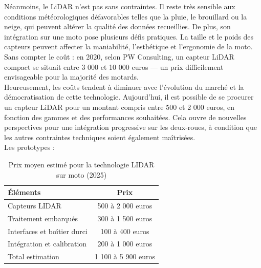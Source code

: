 Néanmoins, le LiDAR n’est pas sans contraintes. Il reste très sensible aux conditions météorologiques défavorables telles que la pluie, le brouillard ou la neige, qui peuvent altérer la qualité des données recueillies. De plus, son intégration sur une moto pose plusieurs défis pratiques. La taille et le poids des capteurs peuvent affecter la maniabilité, l’esthétique et l’ergonomie de la moto. Sans compter le coût : en 2020, selon PW Consulting\cite{marche_capteur_lidar}, un capteur LiDAR compact se situait entre 3 000 et 10 000 euros — un prix difficilement envisageable pour la majorité des motards.\\

Heureusement, les coûts tendent à diminuer avec l’évolution du marché et la démocratisation de cette technologie. Aujourd’hui, il est possible de se procurer un capteur LiDAR pour un montant compris entre 500 et 2 000 euros, en fonction des gammes et des performances souhaitées. Cela ouvre de nouvelles perspectives pour une intégration progressive sur les deux-roues, à condition que les autres contraintes techniques soient également maîtrisées.\\

\vspace{0.5cm}
Les prototypes :\\
\begin{table}[ht]
\centering
\begin{tabular}{|l|c|}
  \hline
  Éléments & Prix \\
  \hline
  Capteurs LIDAR & 500 à 2 000 euros \\
  Traitement embarqués & 300 à 1 500 euros \\
  Interfaces et boîtier durci & 100 à 400 euros \\
  Intégration et calibration & 200 à 1 000 euros \\
  Total estimation & 1 100 à 5 900 euros \\
  \hline
\end{tabular}
\caption{Prix moyen estimé pour la technologie LIDAR sur moto (2025)}
\end{table}

